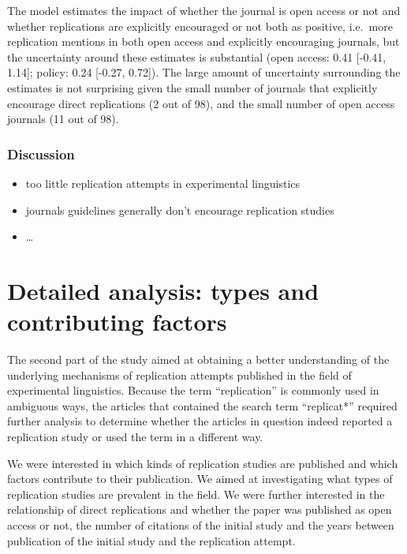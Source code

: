 \documentclass[]{elsarticle} %
\providecommand{\tightlist}{%
  \setlength{\itemsep}{0pt}\setlength{\parskip}{0pt}}
\begin{document}
The model estimates the impact of whether the journal is open access or
not and whether replications are explicitly encouraged or not both as
positive, i.e.~more replication mentions in both open access and
explicitly encouraging journals, but the uncertainty around these
estimates is substantial (open access: 0.41 {[}-0.41, 1.14{]}; policy:
0.24 {[}-0.27, 0.72{]}). The large amount of uncertainty surrounding the
estimates is not surprising given the small number of journals that
explicitly encourage direct replications (2 out of 98), and the small
number of open access journals (11 out of 98).

\hypertarget{discussion}{%
\subsubsection{Discussion}\label{discussion}}

\begin{itemize}
\tightlist
\item
  too little replication attempts in experimental linguistics
\item
  journals guidelines generally don't encourage replication studies
\item
  \ldots{}
\end{itemize}

\hypertarget{detailed-analysis-types-and-contributing-factors}{%
\section{Detailed analysis: types and contributing
factors}\label{detailed-analysis-types-and-contributing-factors}}

The second part of the study aimed at obtaining a better understanding
of the underlying mechanisms of replication attempts published in the
field of experimental linguistics. Because the term ``replication'' is
commonly used in ambiguous ways, the articles that contained the search
term ``replicat*'' required further analysis to determine whether the
articles in question indeed reported a replication study or used the
term in a different way.

We were interested in which kinds of replication studies are published
and which factors contribute to their publication. We aimed at
investigating what types of replication studies are prevalent in the
field. We were further interested in the relationship of direct
replications and whether the paper was published as open access or not,
the number of citations of the initial study and the years between
publication of the initial study and the replication attempt.
\end{document}
